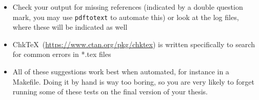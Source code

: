 \begin{itemize}
\begin{itemize}
  \end{itemize}
  \item Check your output for missing references (indicated by a double question mark, you may use \verb|pdftotext| to automate this) or look at the log files, where these will be indicated as well
  \item Chk\TeX\ (\url{https://www.ctan.org/pkg/chktex}) is written specifically to search for common errors in *.tex files
  \item All of these suggestions work best when automated, for instance in a Makefile. Doing it by hand is way too boring, so you are very likely to forget running some of these tests on the final version of your thesis.
\end{itemize}
